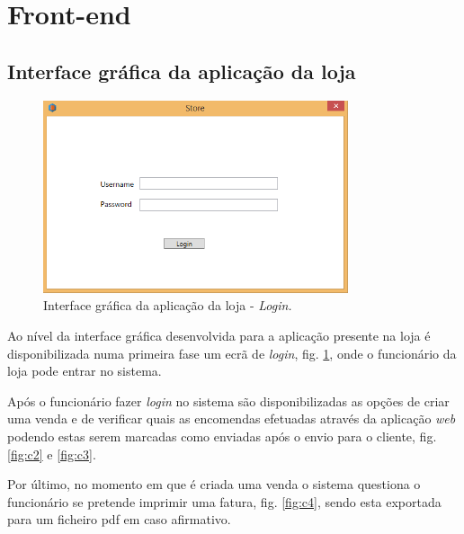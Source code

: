 \documentclass[12pt]{article}
\begin{document}
\section{Front-end}

\subsection{Interface gráfica da aplicação da loja}

\begin{figure}[H]
    \centering
    \includegraphics[width=0.8\textwidth]{Store_GUI_Login.png}
    \caption{Interface gráfica da aplicação da loja - \textit{Login.}}
    \label{fig:c1}
\end{figure}

Ao nível da interface gráfica desenvolvida para a aplicação presente na loja é disponibilizada numa primeira fase um ecrã de \textit{login}, fig. \ref{fig:c1}, onde o funcionário da loja pode entrar no sistema.

Após o funcionário fazer \textit{login} no sistema são disponibilizadas as opções de criar uma venda e de verificar quais as encomendas efetuadas através da aplicação \textit{web} podendo estas serem marcadas como enviadas após o envio para o cliente, fig. \ref{fig:c2} e \ref{fig:c3}.

Por último, no momento em que é criada uma venda o sistema questiona o funcionário se pretende imprimir uma fatura, fig. \ref{fig:c4}, sendo esta exportada para um ficheiro pdf em caso afirmativo.
\end{document}
